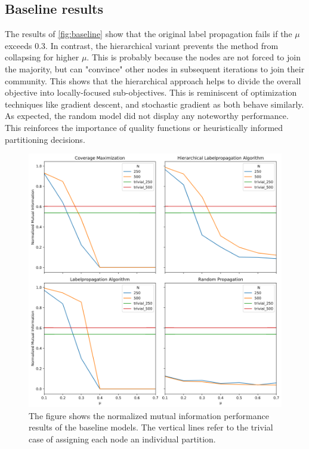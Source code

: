 \documentclass[11pt, twocolumn]{article}
\begin{document}
\subsection{Baseline results}
The results of \autoref{fig:baseline} show that the original label propagation fails if the $\mu$ exceeds 0.3. In contrast, the hierarchical variant prevents the method from collapsing for higher $\mu$. This is probably because the nodes are not forced to join the majority, but can "convince" other nodes in subsequent iterations to join their community. This shows that the hierarchical approach helps to divide the overall objective into locally-focused sub-objectives. This is reminiscent of optimization techniques like gradient descent, and stochastic gradient as both behave similarly. As expected, the random model did not display any noteworthy performance. This reinforces the importance of quality functions or heuristically informed partitioning decisions. 

\begin{figure}[h]
  \includegraphics[width=\linewidth]{baselines.png}
  \caption{The figure shows the normalized mutual information performance results of the baseline models. The vertical lines refer to the trivial case of assigning each node an individual partition.}
  \label{fig:baseline}
\end{figure}
\end{document}
